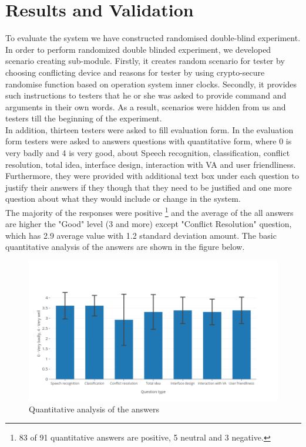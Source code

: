 \documentclass{llncs}
\begin{document}
    \section{Results and Validation}
    To evaluate the system we have constructed randomised double-blind experiment.
    In order to perform randomized double
    blinded experiment, we developed scenario creating sub-module.
    Firstly, it creates random scenario for tester by choosing
    conflicting device and reasons for tester by using crypto-secure randomise function based on operation system inner
    clocks.
    Secondly, it provides such instructions to testers that he or she was
    asked to provide command and arguments in their own words.
    As a result, scenarios were hidden from us and testers till
    the beginning of the experiment.\\
    In addition, thirteen testers were asked to fill evaluation form.
    In the evaluation form testers were asked to answers questions with quantitative form, where 0 is very badly and 4 is very good, about Speech recognition,
    classification, conflict resolution, total idea, interface design, interaction with VA and user friendliness.
    Furthermore, they were provided with additional text box under each question to justify their answers if they though
    that they need to be justified and one more question about what they would include or change in the system.\\
    The majority of the responses were positive \footnote{83 of 91 quantitative answers are positive, 5 neutral and 3 negative.}
    and the average of the all answers are higher the "Good" level (3 and more) except "Conflict Resolution" question, which
    has 2.9 average value with 1.2 standard deviation amount.
    The basic quantitative analysis of the answers are shown in the figure below.\\
    \begin{figure}
        \includegraphics[width=\textwidth]{eval.png}
        \caption[]{Quantitative analysis of the answers}
    \end{figure}
\end{document}
